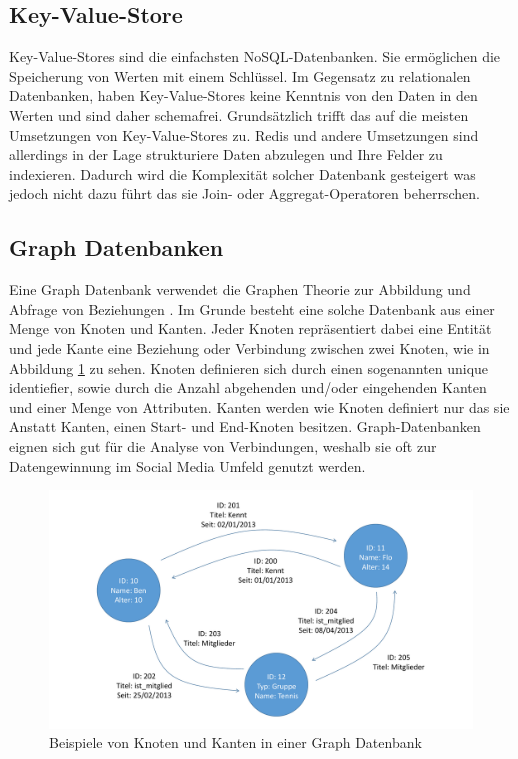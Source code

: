 \subsection{Key-Value-Store}
\label{ch:grundlagen:sec:NoSQL:KeyValueStore}

Key-Value-Stores sind die einfachsten NoSQL-Datenbanken. Sie ermöglichen die Speicherung von Werten mit einem Schlüssel. Im Gegensatz zu relationalen Datenbanken, haben Key-Value-Stores keine Kenntnis von den Daten in den Werten und sind daher schemafrei. Grundsätzlich trifft das auf die meisten Umsetzungen von Key-Value-Stores zu. Redis und andere Umsetzungen sind allerdings in der Lage strukturiere Daten abzulegen und Ihre Felder zu indexieren. Dadurch wird die Komplexität solcher Datenbank gesteigert was jedoch nicht dazu führt das sie Join- oder Aggregat-Operatoren beherrschen. 

\subsection{Graph Datenbanken}
\label{ch:grundlagen:sec:NoSQL:GraphDatenbanken}

Eine Graph Datenbank verwendet die Graphen Theorie zur Abbildung und Abfrage von Beziehungen \cite{SWB-386976589}. Im Grunde besteht eine solche Datenbank aus einer Menge von Knoten und Kanten. Jeder Knoten repräsentiert dabei eine Entität und jede Kante eine Beziehung oder Verbindung zwischen zwei Knoten, wie in Abbildung \ref{graph_database} zu sehen. Knoten definieren sich durch einen sogenannten unique identiefier, sowie durch die Anzahl abgehenden und/oder eingehenden Kanten  und einer Menge von Attributen. Kanten werden wie Knoten definiert nur das sie Anstatt Kanten, einen Start- und End-Knoten besitzen. Graph-Datenbanken eignen sich gut für die Analyse von Verbindungen, weshalb sie oft zur Datengewinnung im Social Media Umfeld genutzt werden.

\begin{figure}[H]
	\centering
  \includegraphics[width=1.0\textwidth, width=1.0\textwidth]{pics/graphdatabase.pdf}
	\caption{Beispiele von Knoten und Kanten in einer Graph Datenbank}
	\label{graph_database}
\end{figure}

